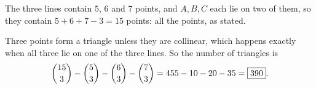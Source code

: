 The three lines contain $5$, $6$ and $7$ points, and $A,B,C$ each lie on two of them, so they contain $5+6+7-3=15$ points: all the points, as stated.

Three points form a triangle unless they are collinear, which happens exactly when all three lie on one of the three lines. So the number of triangles is
\[\dbinom{15}{3}-\dbinom53-\dbinom63-\dbinom73=455-10-20-35=\boxed{390}.\]
